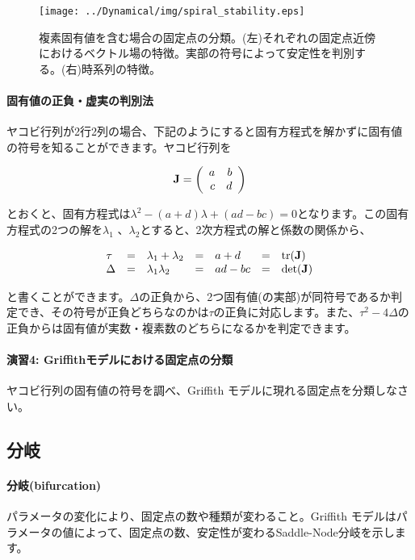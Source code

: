 \begin{figure}[ht]
        \centering \texttt{[image: ../Dynamical/img/spiral\_stability.eps]}
        \caption{複素固有値を含む場合の固定点の分類。(左)それぞれの固定点近傍におけるベクトル場の特徴。実部の符号によって安定性を判別する。(右)時系列の特徴。}
        \label{fig:08bsysbio} \end{figure}


\paragraph{固有値の正負・虚実の判別法}
ヤコビ行列が2行2列の場合、下記のようにすると固有方程式を解かずに固有値の符号を知ることができます。ヤコビ行列を

\[{\bf J} =
\left(
\begin{array}{rr}
a& b\\
c& d\\
\end{array}
\right)
\]

とおくと、固有方程式は\(\lambda^2-(a+d)\lambda+(ad-bc)=0\)となります。この固有方程式の2つの解を\(\lambda_1\) 、\(\lambda_2\)とすると、2次方程式の解と係数の関係から、

\[
\begin{array}{lclclcl}
\tau & = & \lambda_1 + \lambda_2 & = & a + d & = & {\rm tr}({\bf J})\\
\Delta & = &\lambda_1 \lambda_2 & = & ad - bc & = & \det({\bf J})\\
\end{array}
\]

と書くことができます。\(\Delta\)の正負から、2つ固有値(の実部)が同符号であるか判定でき、その符号が正負どちらなのかは\(\tau\)の正負に対応します。また、\(\tau^2 -4\Delta\)の正負からは固有値が実数・複素数のどちらになるかを判定できます。


\paragraph{演習4:  Griffithモデルにおける固定点の分類}
ヤコビ行列の固有値の符号を調べ、Griffith モデルに現れる固定点を分類しなさい。

\subsection{分岐}
\paragraph{分岐(bifurcation)} パラメータの変化により、固定点の数や種類が変わること。Griffith モデルはパラメータの値によって、固定点の数、安定性が変わるSaddle-Node分岐を示します。


